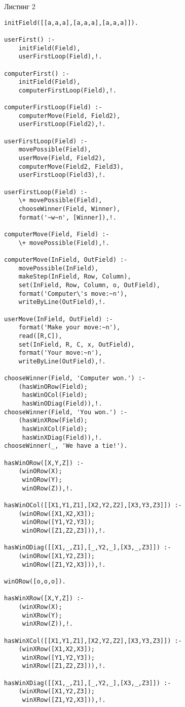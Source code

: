 \documentclass{article}
\begin{document}
\noindent Листинг 2
\begin{lstlisting}
initField([[a,a,a],[a,a,a],[a,a,a]]).

userFirst() :-
    initField(Field),
    userFirstLoop(Field),!.

computerFirst() :-
    initField(Field),
    computerFirstLoop(Field),!.

computerFirstLoop(Field) :-
    computerMove(Field, Field2),
    userFirstLoop(Field2),!.

userFirstLoop(Field) :-
    movePossible(Field),
    userMove(Field, Field2),
    computerMove(Field2, Field3),
    userFirstLoop(Field3),!.

userFirstLoop(Field) :-
    \+ movePossible(Field),
    chooseWinner(Field, Winner),
    format('~w~n', [Winner]),!.

computerMove(Field, Field) :-
    \+ movePossible(Field),!.

computerMove(InField, OutField) :-
    movePossible(InField),
    makeStep(InField, Row, Column),
    set(InField, Row, Column, o, OutField),
    format('Computer\'s move:~n'),
    writeByLine(OutField),!.

userMove(InField, OutField) :-
    format('Make your move:~n'),
    read([R,C]),
    set(InField, R, C, x, OutField),
    format('Your move:~n'),
    writeByLine(OutField),!.

chooseWinner(Field, 'Computer won.') :-
    (hasWinORow(Field);
     hasWinOCol(Field);
     hasWinODiag(Field)),!.
chooseWinner(Field, 'You won.') :-
    (hasWinXRow(Field);
     hasWinXCol(Field);
     hasWinXDiag(Field)),!.
chooseWinner(_, 'We have a tie!').

hasWinORow([X,Y,Z]) :-
    (winORow(X);
     winORow(Y);
     winORow(Z)),!.

hasWinOCol([[X1,Y1,Z1],[X2,Y2,Z2],[X3,Y3,Z3]]) :-
    (winORow([X1,X2,X3]);
     winORow([Y1,Y2,Y3]);
     winORow([Z1,Z2,Z3])),!.

hasWinODiag([[X1,_,Z1],[_,Y2,_],[X3,_,Z3]]) :-
    (winORow([X1,Y2,Z3]);
     winORow([Z1,Y2,X3])),!.

winORow([o,o,o]).

hasWinXRow([X,Y,Z]) :-
    (winXRow(X);
     winXRow(Y);
     winXRow(Z)),!.

hasWinXCol([[X1,Y1,Z1],[X2,Y2,Z2],[X3,Y3,Z3]]) :-
    (winXRow([X1,X2,X3]);
     winXRow([Y1,Y2,Y3]);
     winXRow([Z1,Z2,Z3])),!.

hasWinXDiag([[X1,_,Z1],[_,Y2,_],[X3,_,Z3]]) :-
    (winXRow([X1,Y2,Z3]);
     winXRow([Z1,Y2,X3])),!.


\end{lstlisting}
\end{document}
